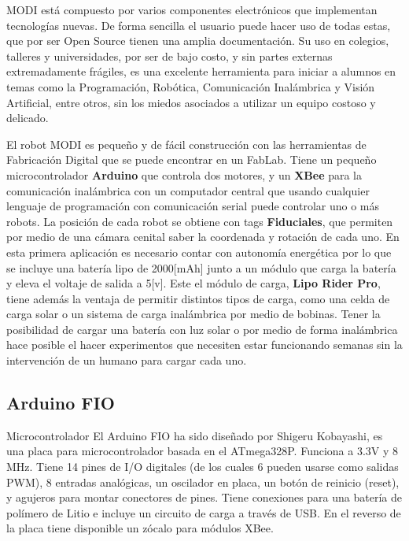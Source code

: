 MODI está compuesto por varios componentes electrónicos que implementan tecnologías nuevas. De forma sencilla el usuario puede hacer uso de todas estas, que por ser Open Source tienen una amplia documentación. Su uso en colegios, talleres y universidades, por ser de bajo costo, y sin partes externas extremadamente frágiles, es una excelente herramienta para iniciar a alumnos en temas como la Programación, Robótica, Comunicación Inalámbrica y Visión Artificial, entre otros, sin los miedos asociados a utilizar un equipo costoso y delicado.

El robot MODI es pequeño y de fácil construcción con las herramientas de Fabricación Digital que se puede encontrar en un FabLab. Tiene un pequeño microcontrolador \textbf{Arduino} que controla dos motores, y un \textbf{XBee} para la comunicación inalámbrica con un computador central que usando cualquier lenguaje de programación con comunicación serial puede controlar uno o más robots. La posición de cada robot se obtiene con tags \textbf{Fiduciales}, que permiten por medio de una cámara cenital saber la coordenada y rotación de cada uno. En esta primera aplicación es necesario contar con autonomía energética por lo que se incluye una batería lipo de 2000[mAh] junto a un módulo que carga la batería y eleva el voltaje de salida a 5[v]. Este el módulo de carga, \textbf{Lipo Rider Pro}, tiene además la ventaja de permitir distintos tipos de carga, como una celda de carga solar o un sistema de carga inalámbrica por medio de bobinas. Tener la posibilidad de cargar una batería con luz solar o por medio de forma inalámbrica hace posible el hacer experimentos que necesiten estar funcionando semanas sin la intervención de un humano para cargar cada uno.

\subsection{Arduino FIO}

Microcontrolador
El Arduino FIO ha sido diseñado por Shigeru Kobayashi, es una placa para microcontrolador basada en el ATmega328P. Funciona a 3.3V y 8 MHz. Tiene 14 pines de I/O digitales (de los cuales 6 pueden usarse como salidas PWM), 8 entradas analógicas, un oscilador en placa, un botón de reinicio (reset), y agujeros para montar conectores de pines. Tiene conexiones para una batería de polímero de Litio e incluye un circuito de carga a través de USB. En el reverso de la placa tiene disponible un zócalo para módulos XBee.

